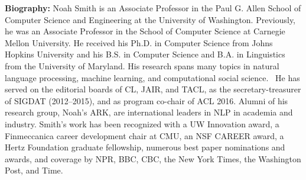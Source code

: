 \noindent
{\bfseries Biography:} Noah Smith is an Associate Professor in the Paul G. Allen School of Computer Science and Engineering at the University of Washington. Previously, he was an Associate Professor in the School of Computer Science at Carnegie Mellon University. He received his Ph.D. in Computer Science from Johns Hopkins University and his B.S. in Computer Science and B.A. in Linguistics from the University of Maryland. His research spans many topics in natural language processing, machine learning, and computational social science.  He has served on the editorial boards of CL, JAIR, and TACL, as the secretary-treasurer of SIGDAT (2012–2015), and as program co-chair of ACL 2016. Alumni of his research group, Noah’s ARK, are international leaders in NLP in academia and industry. Smith’s work has been recognized with a UW Innovation award, a Finmeccanica career development chair at CMU, an NSF CAREER award, a Hertz Foundation graduate fellowship, numerous best paper nominations and awards, and coverage by NPR, BBC, CBC, the New York Times, the Washington Post, and Time.

\newpage
